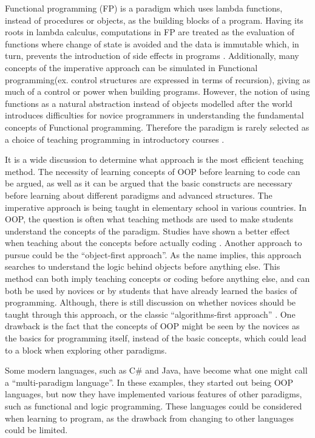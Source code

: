 Functional programming (FP) is a paradigm which uses lambda functions, instead of procedures or objects, as the building blocks of a program. Having its roots in lambda calculus, computations in FP are treated as the evaluation of functions where change of state is avoided and the data is immutable which, in turn, prevents the introduction of side effects in programs \cite{func_programming}. Additionally, many concepts of the imperative approach can be simulated in Functional programming(ex. control structures are expressed in terms of recursion), giving as much of a control or power when building programs. However, the notion of using functions as a natural abstraction instead of objects modelled after the world introduces difficulties for novice programmers in understanding the fundamental concepts of Functional programming. Therefore the paradigm is rarely selected as a choice of teaching programming in introductory courses \cite{TeachFuncProgramming}.

It is a wide discussion to determine what approach is the most efficient teaching method. The necessity of learning concepts of OOP before learning to code can be argued, as well as it can be argued that the basic constructs are necessary before learning about different paradigms and advanced structures. The imperative approach is being taught in elementary school in various countries. In OOP, the question is often what teaching methods are used to make students understand the concepts of the paradigm. Studies have shown a better effect when teaching about the concepts before actually coding \cite{Xinogalos15}. Another approach to pursue could be the ``object-first approach''. As the name implies, this approach searches to understand the logic behind objects before anything else. This method can both imply teaching concepts or coding before anything else, and can both be used by novices or by students that have already learned the basics of programming. Although, there is still discussion on whether novices should be taught through this approach, or the classic ``algorithms-first approach'' \cite{Periyamasy12}. One drawback is the fact that the concepts of OOP might be seen by the novices as the basics for programming itself, instead of the basic concepts, which could lead to a block when exploring other paradigms.

Some modern languages, such as C\# and Java, have become what one might call a ``multi-paradigm language''. In these examples, they started out being OOP languages, but now they have implemented various features of other paradigms, such as functional and logic programming. These languages could be considered when learning to program, as the drawback from changing to other languages could be limited.